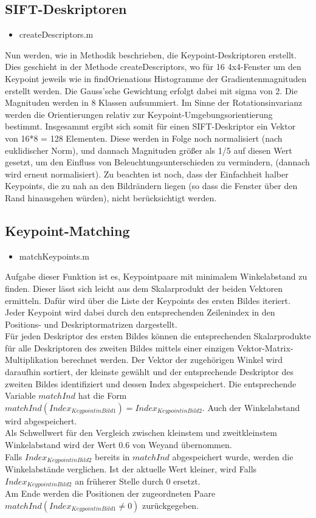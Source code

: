 \documentclass[deutsch]{scrartcl}
\begin{document}
\subsection{SIFT-Deskriptoren}
\begin{itemize}
	\item createDescriptors.m 
\end{itemize}
Nun werden, wie in Methodik beschrieben, die Keypoint-Deskriptoren erstellt. Dies geschieht in der Methode createDescriptors, wo für 16 4x4-Fenster um den Keypoint jeweils wie in findOrienations Histogramme der Gradientenmagnituden erstellt werden. Die Gauss'sche Gewichtung erfolgt dabei mit sigma von 2. Die Magnituden werden in 8 Klassen aufsummiert. Im Sinne der Rotationsinvarianz werden die Orientierungen relativ zur Keypoint-Umgebungsorientierung bestimmt. Insgesammt ergibt sich somit für einen SIFT-Deskriptor ein Vektor von 16*8 = 128 Elementen. Diese werden in Folge noch normalisiert (nach euklidischer Norm), und dannach Magnituden größer als 1/5 auf diesen Wert gesetzt, um den Einfluss von Beleuchtungsunterschieden zu vermindern, (dannach wird erneut normalisiert). Zu beachten ist noch, dass der Einfachheit halber Keypoints, die zu nah an den Bildrändern liegen (so dass die Fenster über den Rand hinausgehen würden), nicht berücksichtigt werden.

\subsection{Keypoint-Matching}
\begin{itemize}
	\item matchKeypoints.m
\end{itemize}
Aufgabe dieser Funktion ist es, Keypointpaare mit minimalem Winkelabstand zu finden. Dieser lässt sich leicht aus dem Skalarprodukt der beiden Vektoren ermitteln. Dafür wird über die Liste der Keypoints des ersten Bildes iteriert. Jeder Keypoint wird dabei durch den entsprechenden Zeilenindex in den Positions- und Deskriptormatrizen dargestellt. \\ 
Für jeden Deskriptor des ersten Bildes können die entsprechenden Skalarprodukte für alle Deskriptoren des zweiten Bildes mittels einer einzigen Vektor-Matrix-Multiplikation berechnet werden. Der Vektor der zugehörigen Winkel wird daraufhin sortiert, der kleinste gewählt und der entsprechende Deskriptor des zweiten Bildes identifiziert und dessen Index abgespeichert. Die entsprechende Variable $matchInd$ hat die Form $matchInd( Index_{Keypoint in Bild1} ) = Index_{Keypoint in Bild 2}$. Auch der Winkelabstand wird abgespeichert. \\
Als Schwellwert für den Vergleich zwischen kleinstem und zweitkleinstem Winkelabstand wird der Wert 0.6 von Weyand\cite{pandemo} übernommen. \\
Falls $Index_{Keypoint in Bild 2}$ bereits in $matchInd$ abgespeichert wurde, werden die Winkelabstände verglichen. Ist der aktuelle Wert kleiner, wird Falls $Index_{Keypoint in Bild 2}$ an früherer Stelle durch 0 ersetzt. \\
Am Ende werden die Positionen der zugeordneten Paare\\$matchInd(Index_{Keypoint in Bild1} \neq 0)$  zurückgegeben.
\end{document}

